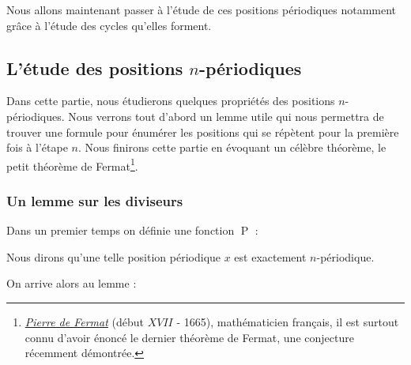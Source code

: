 \documentclass[a4paper,french,12pt]{article}
\begin{document}
Nous allons maintenant passer à l'étude de ces positions périodiques notamment grâce à l'étude des cycles qu'elles forment.


\subsection{L'étude des positions $n$-périodiques}
Dans cette partie, nous étudierons quelques propriétés des positions $n$-périodiques. Nous verrons tout d'abord un lemme utile qui nous permettra de trouver une formule pour énumérer les positions qui se répètent pour la première fois à l'étape $n$. Nous finirons cette partie en évoquant un célèbre théorème, le petit théorème de Fermat\footnote{\href{https://fr.wikipedia.org/wiki/Pierre_de_Fermat}{\emph{Pierre de Fermat}} (début $XVII$ - 1665), mathématicien français, il est surtout connu d'avoir énoncé le dernier théorème de Fermat, une conjecture récemment démontrée.}.
\subsubsection{Un lemme sur les diviseurs}
Dans un premier temps on définie une fonction $\operatorname{P}$ :


Nous dirons qu'une telle position périodique $x$ est exactement $n$-périodique.

On arrive alors au lemme :

\hypertarget{18}{}

\end{document}
